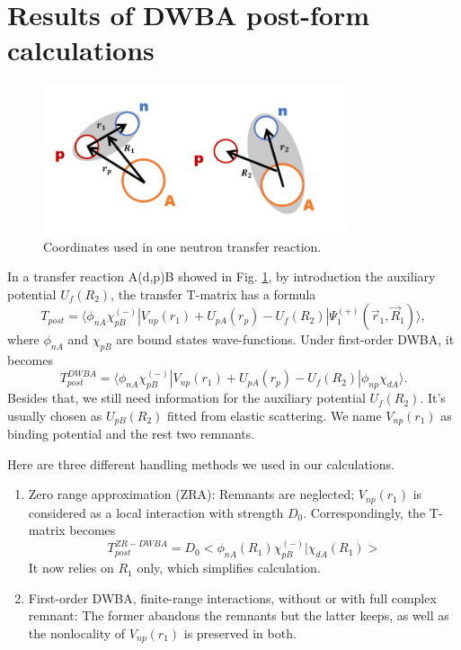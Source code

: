 \section{Results of DWBA post-form calculations}\label{sec:post}

\begin{figure}[t]
	\centering
	\includegraphics[width=0.80\textwidth]{transfer.png}
	\caption{Coordinates used in one neutron transfer reaction. }
	\label{fig:transfer}
\end{figure}
In a transfer reaction A(d,p)B showed in Fig. \ref{fig:transfer}, by introduction the auxiliary potential $U_f(R_2)$, the transfer T-matrix has a formula \cite{thompson2009nuclear}
\begin{equation}\label{eq:postexact}
	T_{post}=\langle\phi_{nA}\chi_{pB}^{(-)}\left|V_{np}(r_1)+U_{pA}(r_p)-U_f(R_2)\right|\Psi_1^{(+)}(\vec{r}_1,\vec{R}_1)\rangle,
\end{equation}
where $\phi_{nA}$ and $\chi_{pB}$ are bound states wave-functions. 
Under first-order DWBA, it becomes
\begin{equation}\label{tpost}
	T_{post}^{DWBA}=\langle\phi_{nA}\chi_{pB}^{(-)}\left|V_{np}(r_1)+U_{pA}(r_p)-U_f(R_2)\right|\phi_{np}\chi_{dA}\rangle.
\end{equation}
Besides that, we still need information for the auxiliary potential $U_f(R_2)$. 
It's usually chosen as $U_{pB}(R_2)$ fitted from elastic scattering.
We name $V_{np}(r_1)$ as binding potential and the rest two remnants.

Here are three different handling methods we used in our calculations.
\begin{enumerate}
\item Zero range approximation (ZRA): Remnants are neglected; $V_{np}(r_1)$ is considered as a local interaction with strength $D_0$.
	Correspondingly, the T-matrix becomes
	\begin{equation}
		T_{post}^{ZR-DWBA}=D_0<\phi_{nA}(R_1)\chi_{pB}^{(-)}| \chi_{dA}(R_1)>
	\end{equation}
	It now relies on $R_1$ only, which simplifies calculation.
	\item First-order DWBA, finite-range interactions, without or with full complex remnant: The former abandons the remnants but the latter keeps, as well as the nonlocality of $V_{np}(r_1)$ is preserved in both.
\end{enumerate}

